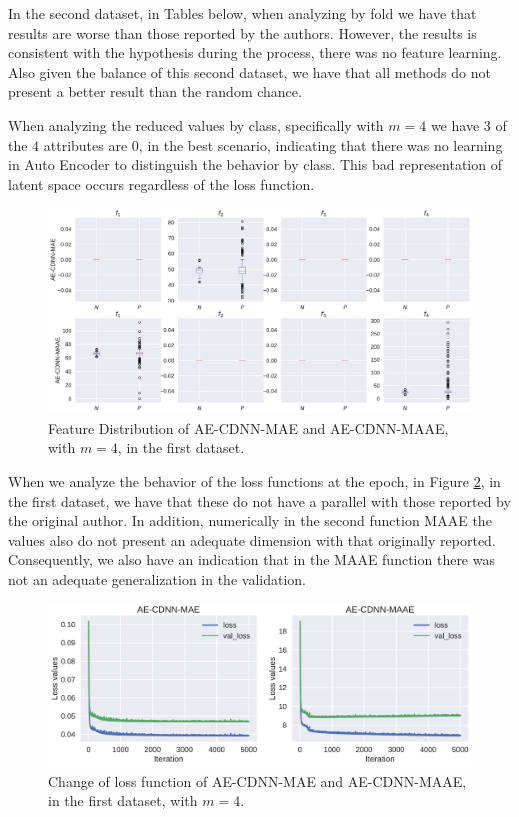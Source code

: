 In the second dataset, in Tables below, when analyzing by fold we have that results are worse than those reported by the authors. However, the results is consistent with the hypothesis during the process, there was no feature learning. Also given the balance of this second dataset, we have that all methods do not present a better result than the random chance. 





When analyzing the reduced values by class, specifically with $m = 4$ we have $3$ of the $4$ attributes are $0$, in the best scenario, indicating that there was no learning in Auto Encoder to distinguish the behavior by class. This bad representation of latent space occurs regardless of the loss function.


\begin{figure}[!ht]
\centering
\includegraphics[width=0.8\linewidth]{figure/feature_distribution_4.pdf}
  \caption{Feature Distribution of AE-CDNN-MAE and AE-CDNN-MAAE, with $m=4$, in the first dataset. }
\label{fig:feature_distribution_4}
\end{figure}



When we analyze the behavior of the loss functions at the epoch, in Figure \ref{fig:change_loss_mae_maae}, in the first dataset, we have that these do not have a parallel with those reported by the original author. In addition, numerically in the second function MAAE the values also do not present an adequate dimension with that originally reported. Consequently, we also have an indication that in the MAAE function there was not an adequate generalization in the validation.


\begin{figure}[!ht]
\centering
\includegraphics[width=0.8\linewidth]{figure/change_loss_mae_maae.pdf}
  \caption{Change of loss function of AE-CDNN-MAE and AE-CDNN-MAAE, in the first dataset, with $m=4$.}
\label{fig:change_loss_mae_maae}
\end{figure}


